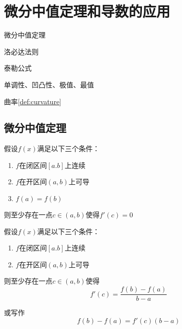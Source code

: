 \setcounter{chapter}{2}

\chapter{微分中值定理和导数的应用}

\begin{introduction}
    \item 微分中值定理
    \item 洛必达法则
    \item 泰勒公式
    \item 单调性、凹凸性、极值、最值
    \item 曲率\ref{def:curvature}
\end{introduction}

\section{微分中值定理}
\begin{theorem}[罗尔中值定理] \label{thm:Rolle's_theorem}
    假设$f(x)$满足以下三个条件：
    \begin{enumerate}
        \item $f$在闭区间$[a.b]$上连续
        \item $f$在开区间$(a,b)$上可导
        \item $f(a)=f(b)$
    \end{enumerate}

    则至少存在一点$c\in(a,b)$使得$f'(c)=0$
\end{theorem}

\begin{theorem}[拉格朗日中值定理] \label{thm:the_mean_value_theorem}
    假设$f(x)$满足以下三个条件：
    \begin{enumerate}
        \item $f$在闭区间$[a.b]$上连续
        \item $f$在开区间$(a,b)$上可导
    \end{enumerate}

    则至少存在一点$c\in(a,b)$使得
    \begin{equation}
        f'(c) = \dfrac{f(b)-f(a)}{b-a}
        \nonumber
    \end{equation}

    或写作
    \begin{equation}
        f(b)-f(a) = f'(c)(b-a)
        \nonumber
    \end{equation}
\end{theorem}

